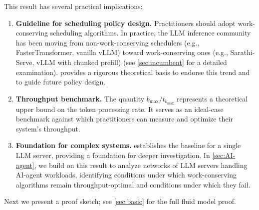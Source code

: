 \documentclass[11pt]{article}
\theoremstyle{plain}
\theoremstyle{definition}
\theoremstyle{remark}
\begin{document}
This result has several practical implications:
\begin{enumerate}
    \item \textbf{Guideline for scheduling policy design.} Practitioners should adopt work-conserving scheduling algorithms. In practice, the LLM inference community has been moving from non-work-conserving schedulers (e.g., FasterTransformer, vanilla vLLM) toward work-conserving ones (e.g., Sarathi-Serve, vLLM with chunked prefill) (see \cref{sec:incumbent} for a detailed examination).  provides a rigorous theoretical basis to endorse this trend and to guide future policy design.

    \item \textbf{Throughput benchmark.} The quantity $b_{\max}/t_{b_{\max}}$ represents a theoretical upper bound on the token processing rate. It serves as an ideal-case benchmark against which practitioners can measure and optimize their system's throughput.

    \item \textbf{Foundation for complex systems.}  establishes the baseline for a single LLM server, providing a foundation for deeper investigation. In \cref{sec:AI-agent}, we build on this result to analyze networks of LLM servers handling AI-agent workloads, identifying conditions under which work-conserving algorithms remain throughput-optimal and conditions under which they fail.
\end{enumerate}

Next we present a proof sketch; see \cref{sec:basic} for the full fluid model proof.
\end{document}
